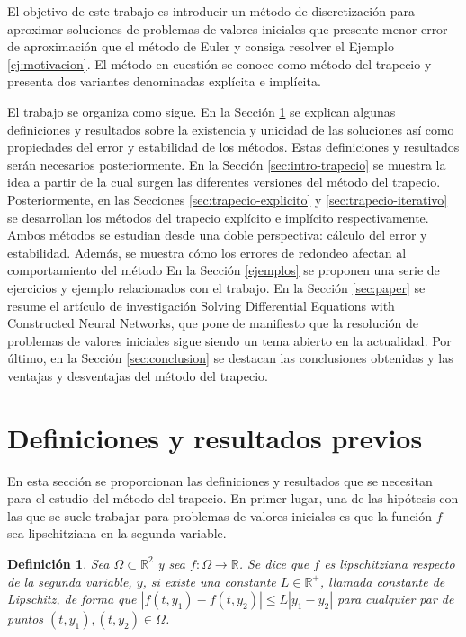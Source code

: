 \documentclass{article}
\theoremstyle{theorem-style}  %
\theoremstyle{definition-style}
\newtheorem{definition}{Definición}[section]
\theoremstyle{example-style}
\begin{document}
	El objetivo de este trabajo es introducir un método de discretización para aproximar soluciones de problemas de valores iniciales que presente menor error de aproximación que el método de Euler y consiga resolver el Ejemplo \ref{ej:motivacion}. El método en cuestión se conoce como método del trapecio y presenta dos variantes denominadas explícita e implícita.

	El trabajo se organiza como sigue. En la Sección \ref{sec:previo} se explican algunas definiciones y resultados sobre la existencia y unicidad de las soluciones así como propiedades del error y estabilidad de los métodos. Estas definiciones y resultados serán necesarios posteriormente. En la Sección \ref{sec:intro-trapecio} se muestra la idea a partir de la cual surgen las diferentes versiones del método del trapecio. Posteriormente, en las Secciones \ref{sec:trapecio-explicito} y \ref{sec:trapecio-iterativo} se desarrollan los métodos del trapecio explícito e implícito respectivamente. Ambos métodos se estudian desde una doble perspectiva: cálculo del error y estabilidad. Además, se muestra cómo los errores de redondeo afectan al comportamiento del método En la Sección \ref{ejemplos} se proponen una serie de ejercicios y ejemplo relacionados con el trabajo. En la Sección \ref{sec:paper} se resume el artículo de investigación Solving Differential Equations with Constructed Neural Networks, que pone de manifiesto que la resolución de problemas de valores iniciales sigue siendo un tema abierto en la actualidad. Por último, en la Sección \ref{sec:conclusion} se destacan las conclusiones obtenidas y las ventajas y desventajas del método del trapecio.

\section{Definiciones y resultados previos} \label{sec:previo}

	En esta sección se proporcionan las definiciones y resultados que se necesitan para el estudio del método del trapecio. En primer lugar, una de las hipótesis con las que se suele trabajar para problemas de valores iniciales es que la función $f$ sea lipschitziana en la segunda variable.

	\begin{definition}
		Sea $\Omega \subset \mathbb{R}^2$ y sea $f : \Omega \rightarrow \mathbb{R}$. Se dice que $f$ es lipschitziana respecto de la segunda variable, $y$, si existe una constante $L \in \mathbb{R^{+}}$, llamada constante de Lipschitz, de forma que $|f(t,y_1) - f(t, y_2)| \le L|y_1 - y_2|$ para cualquier par de puntos $(t,y_1), (t,y_2) \in \Omega$.
	\end{definition}
\end{document}
